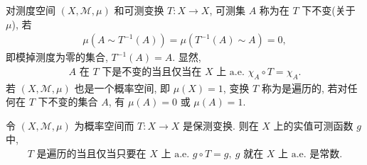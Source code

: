 \documentclass[../../main.tex]{subfiles}
\begin{document}
对测度空间 $(X,\mathcal{M},\mu)$ 和可测变换 $T:X\to X$, 可测集 $A$ 称为在 $T$ 下不变(关于 $\mu$), 若
\begin{align*}
\mu(A\sim T^{-1}(A))=\mu(T^{-1}(A)\sim A)=0,
\end{align*}
即模掉测度为零的集合, $T^{-1}(A)=A$. 显然,
\begin{align}
A\text{ 在 }T\text{ 下是不变的当且仅当在 }X\text{ 上 a.e. }\chi_{A}\circ T=\chi_{A}.
\label{align:ch22-invariant-set-char}
\end{align}
若 $(X,\mathcal{M},\mu)$ 也是一个概率空间, 即 $\mu(X)=1$, 变换 $T$ 称为是遍历的, 若对任何在 $T$ 下不变的集合 $A$, 有 $\mu(A)=0$ 或 $\mu(A)=1$.

\begin{proposition}[遍历性的函数刻画]\label{proposition:ch22-ergodic-char}
令 $(X,\mathcal{M},\mu)$ 为概率空间而 $T:X\to X$ 是保测变换. 则在 $X$ 上的实值可测函数 $g$ 中,
\begin{align}
T\text{ 是遍历的当且仅当只要在 }X\text{ 上 a.e. }g\circ T=g,\ g\text{ 就在 }X\text{ 上 a.e. 是常数}.
\label{align:ch22-ergodic-func}
\end{align}
\end{proposition}
\end{document}
